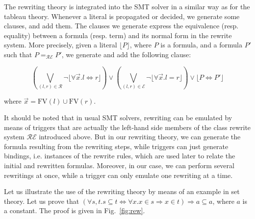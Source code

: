 The rewriting theory is integrated into the SMT solver in a similar way as for
the tableau theory. Whenever a literal is propagated or decided, we generate some clauses,
and add them. The clauses we generate
express the equivalence (resp. equality) between a formula (resp. term) and its normal form
in the rewrite system. More precisely, given a literal
$\lfloor{}P\rfloor$, where $P$ is a formula, and a formula $P'$ such that
$P=_\mathcal{RE}P'$, we generate and add the following clause:

$$\left(\bigvee_{(l,r)\in\mathcal{R}}
\neg\lfloor\forall{}\vec{x}.l\Leftrightarrow{}r\rfloor\right)\lor
\left(\bigvee_{(l,r)\in\mathcal{E}}\neg\lfloor\forall{}\vec{x}.l=r\rfloor\right)\lor
\lfloor{}P\Leftrightarrow{}P'\rfloor$$

where $\vec{x}=\mathrm{FV}(l)\cup\mathrm{FV}(r)$.

It should be noted that in usual SMT solvers, rewriting can be emulated by means
of triggers that are actually the left-hand side members of the class rewrite
system $\mathcal{RE}$ introduced above. But in our rewriting theory, we can
generate the formula resulting from the rewriting steps, while triggers can just
generate bindings, i.e. instances of the rewrite rules, which are used later to
relate the initial and rewritten formulas. Moreover, in our case, we can perform
several rewritings at once, while a trigger can only emulate one rewriting at a
time.

Let us illustrate the use of the rewriting theory by means of an example in set
theory. Let us prove that
$(\forall{}s,t.s\subseteq{}t\Leftrightarrow{}\forall{}x.x\in{}s\Rightarrow{}
x\in{}t) \Rightarrow{} {}a\subseteq{}a$, where $a$ is a constant. The proof is given
in Fig.~\ref{fig:rew}.

